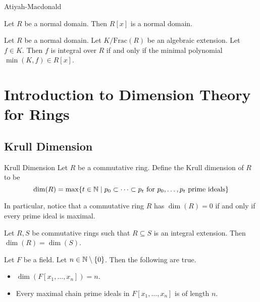 \documentclass[a4paper]{article}
\begin{document}
Atiyah-Macdonald

\begin{prp}{}{} Let $R$ be a normal domain. Then $R[x]$ is a normal domain. 
\end{prp}

\begin{prp}{}{} Let $R$ be a normal domain. Let $K/\text{Frac}(R)$ be an algebraic extension. Let $f\in K$. Then $f$ is integral over $R$ if and only if the minimal polynomial $\min(K,f)\in R[x]$. 
\end{prp}

\pagebreak
\section{Introduction to Dimension Theory for Rings}
\subsection{Krull Dimension}
\begin{defn}{Krull Dimension}{} Let $R$ be a commutative ring. Define the Krull dimension of $R$ to be $$\dim(R)=\max\{t\in\mathbb{N}\;|\;p_0\subset\dots\subset p_t\text{ for }p_0,\dots,p_t\text{ prime ideals}\}$$
\end{defn}

In particular, notice that a commutative ring $R$ has $\dim(R)=0$ if and only if every prime ideal is maximal. 

\begin{lmm}{}{} Let $R,S$ be commutative rings such that $R\subseteq S$ is an integral extension. Then $\dim(R)=\dim(S)$. 
\end{lmm}

\begin{prp}{}{} Let $F$ be a field. Let $n\in\mathbb{N}\setminus\{0\}$. Then the following are true. 
\begin{itemize}
\item $\dim(F[x_1,\dots,x_n])=n$. 
\item Every maximal chain prime ideals in $F[x_1,\dots,x_n]$ is of length $n$. 
\end{itemize}
\end{prp}
\end{document}
